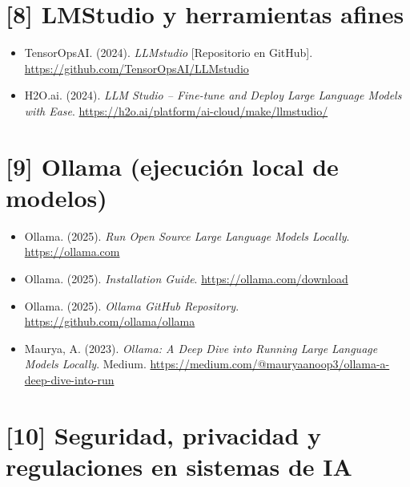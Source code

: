 \documentclass[12pt,a4paper]{report}
\numberwithin{figure}{section}
\begin{document}
\section*{[8] LMStudio y herramientas afines}
\label{ref:8}
\begin{itemize}
  \item TensorOpsAI. (2024). \textit{LLMstudio} [Repositorio en GitHub]. \url{https://github.com/TensorOpsAI/LLMstudio}
  \item H2O.ai. (2024). \textit{LLM Studio – Fine-tune and Deploy Large Language Models with Ease}. \url{https://h2o.ai/platform/ai-cloud/make/llmstudio/}
\end{itemize}

\section*{[9] Ollama (ejecución local de modelos)}
\label{ref:9}
\begin{itemize}
  \item Ollama. (2025). \textit{Run Open Source Large Language Models Locally}. \url{https://ollama.com}
  \item Ollama. (2025). \textit{Installation Guide}. \url{https://ollama.com/download}
  \item Ollama. (2025). \textit{Ollama GitHub Repository}. \url{https://github.com/ollama/ollama}
  \item Maurya, A. (2023). \textit{Ollama: A Deep Dive into Running Large Language Models Locally}. Medium. \url{https://medium.com/@mauryaanoop3/ollama-a-deep-dive-into-run}
\end{itemize}

\section*{[10] Seguridad, privacidad y regulaciones en sistemas de IA}
\label{ref:10}
\end{document}
